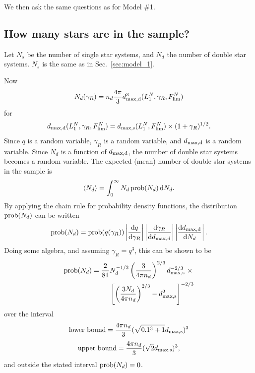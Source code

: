 \documentclass{emulateapj}
\begin{document}
We then ask the same questions as for Model \#1.

\subsection{How many stars are in the sample?}

Let $N_s$ be the number of single star systems, and $N_d$ the number of double 
star systems. $N_s$ is the same as in Sec.~\ref{sec:model_1}.

Now
\begin{equation}
N_d(\gamma_R) = n_d \frac{4\pi}{3} d_{\rm max,d}^3(L_1^N, \gamma_R, F_{\rm 
	lim}^N)
\end{equation}
for
\begin{equation}
d_{\rm max,d}(L_1^N, \gamma_R, F_{\rm lim}^N) =
d_{\rm max,s}(L_1^N, F_{\rm lim}^N)\times (1+\gamma_R)^{1/2}.
\end{equation}
Since $q$ is a random variable, $\gamma_R$ is a random variable, and $d_{\rm 
	max,d}$ is a random variable. Since $N_d$ is a function of $d_{\rm max,d}$, 
the number of double star systems becomes a random variable.
The expected (mean) number of double star systems in the sample is
\begin{equation}
\langle N_d \rangle = \int_{0}^{\infty} N_d\, {\rm prob}(N_d) \,{\rm d}N_d.
\end{equation}
By applying the chain rule for probability density functions, the distribution 
${\rm prob}(N_d)$ can be written 
\begin{equation}
{\rm prob}(N_d) = {\rm prob}(q(\gamma_R)) 
\left| \frac{{\rm d}q}{{\rm d}\gamma_R}  \right|
\left| \frac{{\rm d}\gamma_R}{{\rm d}d_{\rm max,d}}  \right|				
\left| \frac{{\rm d}d_{\rm max,d}}{{\rm d}N_d}  \right|.
\end{equation}
Doing some algebra, and assuming $\gamma_R = q^3$, this can be shown to be
\begin{align}
{\rm prob}(N_d) = \frac{2}{81} &N_d^{-1/3} \left(\frac{3}{4\pi 
	n_d}\right)^{2/3} d_{\rm max,s}^{-2/3} \ \times \nonumber\\
&\left[ \left(\frac{3 N_d}{4\pi n_d}\right)^{2/3} - d_{\rm 
	max,s}^2 \right]^{-2/3}
\end{align}
over the interval
\begin{equation}
{\rm lower\ bound} = \frac{4 \pi n_d}{3} (\sqrt{0.1^3 + 1} d_{\rm max,s})^3
\end{equation}
\begin{equation}
{\rm upper\ bound} = \frac{4 \pi n_d}{3} (\sqrt{2}d_{\rm max,s})^3,
\end{equation}
and outside the stated interval ${\rm prob}(N_d) = 0$.
\end{document}
